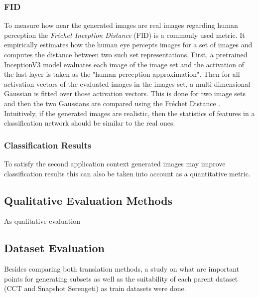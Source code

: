 \documentclass[a4paper,11pt, DIV=12]{scrartcl}
\begin{document}
\subsubsection*{FID}
To measure how near the generated images are real images regarding human perception the \textit{Fréchet Inception Distance} (FID) \cite{ttur} is a commonly used metric.
It empirically estimates how the human eye percepts images for a set of images and computes the distance between two such set representations.
First, a pretrained InceptionV3 model evaluates each image of the image set and the activation of the last layer is taken as the "human perception approximation".
Then for all activation vectors of the evaluated images in the images set, a multi-dimensional Gaussian is fitted over those activation vectors.
This is done for two image sets and then the two Gaussians are compared using the Fréchet Distance \cite{ttur}.
Intuitively, if the generated images are realistic, then the statistics of features in a classification network should be similar to the real ones.

\subsubsection*{Classification Results}
To satisfy the second application context generated images may improve classification results this can also be taken into account as a quantitative metric.


\subsection{Qualitative Evaluation Methods}
As qualitative evaluation


\subsection{Dataset Evaluation}
Besides comparing both translation methods, a study on what are important points for generating subsets as well as the suitability of each parent dataset
(CCT and Snapshot Serengeti) as train datasets were done.
\end{document}
